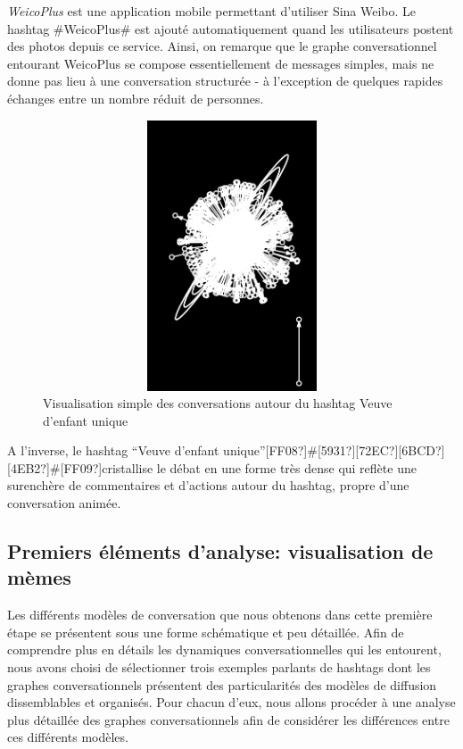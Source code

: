 \textit{WeicoPlus }est une application mobile permettant
d{\textquoteright}utiliser Sina Weibo. Le hashtag \#WeicoPlus\# est
ajout\'e automatiquement quand les utilisateurs postent des photos
depuis ce service. Ainsi, on remarque que le graphe conversationnel
entourant WeicoPlus se compose essentiellement de messages simples,
mais ne donne pas lieu \`a une conversation structur\'ee - \`a
l{\textquoteright}exception de quelques rapides \'echanges entre un
nombre r\'eduit de personnes.



\begin{figure}
    \centering
    \includegraphics[width=5.0449in,height=3.1559in]{figures/chap3/chapitre3-img12.png}
    \caption[Visualisation simple des conversations autour du hashtag Veuve d{\textquoteright}enfant unique]{Visualisation simple des conversations autour du hashtag Veuve d{\textquoteright}enfant unique}
\end{figure}

A l{\textquoteright}inverse, le hashtag {\textquotedblleft}Veuve
d{\textquoteright}enfant
unique{\textquotedblright}[FF08?]\#[5931?][72EC?][6BCD?][4EB2?]\#[FF09?]cristallise
le d\'ebat en une forme tr\`es dense qui refl\`ete une surench\`ere de
commentaires et d{\textquoteright}actions autour du hashtag, propre
d{\textquoteright}une conversation anim\'ee. 

\subsection[Premiers \'el\'ements d{\textquoteright}analyse: visualisation de m\`emes ]{Premiers \'el\'ements d{\textquoteright}analyse: visualisation de m\`emes }
Les diff\'erents mod\`eles de conversation que nous obtenons dans cette
premi\`ere \'etape se pr\'esentent sous une forme sch\'ematique et peu
d\'etaill\'ee. Afin de comprendre plus en d\'etails les dynamiques
conversationnelles qui les entourent, nous avons choisi de
s\'electionner trois exemples parlants de hashtags dont les graphes
conversationnels pr\'esentent des particularit\'es des mod\`eles de
diffusion dissemblables et organis\'es. Pour chacun
d{\textquoteright}eux, nous allons proc\'eder \`a une analyse plus
d\'etaill\'ee des graphes conversationnels afin de consid\'erer les
diff\'erences entre ces diff\'erents mod\`eles.



